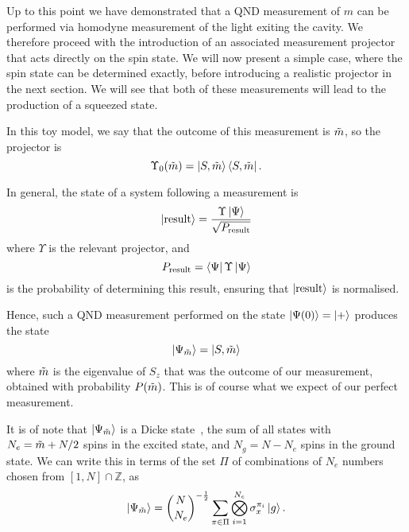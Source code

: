 Up to this point we have demonstrated that a QND measurement of $m$ can be
performed via homodyne measurement of the light exiting the cavity. We
therefore proceed with the introduction of an associated measurement projector
that acts directly on the spin state. We will now present a simple case, where
the spin state can be determined exactly, before introducing a realistic
projector in the next section. We will see that both of these measurements will
lead to the production of a squeezed state.

In this toy model, we say that the outcome of this measurement is $\tilde{m}$,
so the projector is
%
\begin{equation}
  \Upsilon_0(\tilde{m}) = \ket{S, \tilde{m}}\bra{S, \tilde{m}}.
\end{equation}

In general, the state of a system following a measurement
is~\cite{gerry_knight_2004}
%
\begin{equation}
  \ket{\text{result}} = \frac{\Upsilon\ket{\Psi}}{\sqrt{P_\text{result}}}
  \label{squeeze:eqn:projresult}
\end{equation}
%
where $\Upsilon$ is the relevant projector, and
%
\begin{equation}
  P_\text{result} = \bra{\Psi}\Upsilon\ket{\Psi}
\end{equation}
%
is the probability of determining this result, ensuring that
$\ket{\text{result}}$ is normalised.

Hence, such a QND measurement performed on the state $\ket{\Psi(0)} =
\ket{+}$ produces the state
%
\begin{equation}
  \ket{\Psi_{\tilde{m}}} = \ket{S, \tilde{m}}
\end{equation}
%
where $\tilde{m}$ is the eigenvalue of $S_z$ that was the outcome of our
measurement, obtained with probability $P(\tilde{m})$. This is of course what we
expect of our perfect measurement.

It is of note that $\ket{\Psi_{\tilde{m}}}$ is a Dicke
state~\cite{Baertschi2019}, the sum of all states with $N_e = \tilde{m} + N/2$
spins in the excited state, and $N_g = N - N_e$ spins in the ground state.  We
can write this in terms of the set $\Pi$ of combinations of $N_e$ numbers
chosen from $[1,N]\cap\mathbb{Z}$, as
%
\begin{equation}
  \ket{\Psi_{\tilde{m}}} = \binom{N}{N_e}^{-\frac{1}{2}}\sum_{\pi \in \Pi}
  \bigotimes_{i=1}^{N_e} \sigma_x^{\pi_i} \ket{g}.
\end{equation}

